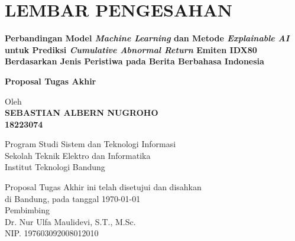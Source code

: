 \chapter*{LEMBAR PENGESAHAN}


\begin{center}
    \vspace{2cm}
  {\large\bfseries Perbandingan Model \emph{Machine Learning} dan Metode \emph{Explainable AI} untuk Prediksi \emph{Cumulative Abnormal Return} Emiten IDX80 Berdasarkan Jenis Peristiwa pada Berita Berbahasa Indonesia}\\
     \vspace{2cm}

  {\Large \textbf{Proposal Tugas Akhir}}\\


  \vspace{1.5cm}
    
    
  {\large Oleh}\\[0.3cm]
    \textbf{
    {\large SEBASTIAN ALBERN NUGROHO}\\
    {\large 18223074}
  }\\
    
  \vspace{0.5cm}
 
  {\large Program Studi Sistem dan Teknologi Informasi}\\
  {\large Sekolah Teknik Elektro dan Informatika}\\
  {\large Institut Teknologi Bandung}\\

  \vspace{1.5cm}

  Proposal Tugas Akhir ini telah disetujui dan disahkan\\
  di Bandung, pada tanggal \today\\[1cm]

	Pembimbing  \\[3cm]
	Dr. Nur Ulfa Maulidevi, S.T., M.Sc.   \\[0.2cm]
	NIP. 197603092008012010 

\end{center}

\vspace{1cm}
\noindent


